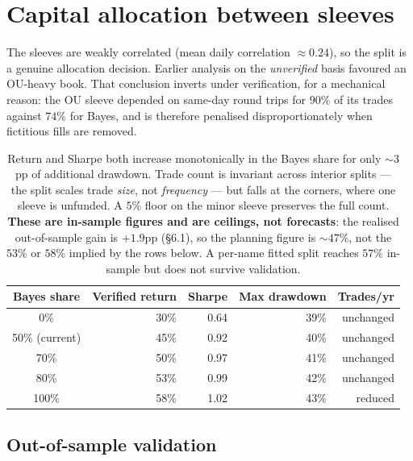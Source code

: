 \documentclass[11pt]{article}
\begin{document}
\section{Capital allocation between sleeves}

The sleeves are weakly correlated (mean daily correlation $\approx0.24$), so the split is a
genuine allocation decision. Earlier analysis on the \emph{unverified} basis favoured an
OU-heavy book. That conclusion inverts under verification, for a mechanical reason: the OU
sleeve depended on same-day round trips for $90\%$ of its trades against $74\%$ for Bayes, and
is therefore penalised disproportionately when fictitious fills are removed.

\begin{table}[H]\centering\small
\renewcommand{\arraystretch}{1.15}
\begin{tabular}{c r r r r}
\toprule
\textbf{Bayes share} & \textbf{Verified return} & \textbf{Sharpe} & \textbf{Max drawdown} & \textbf{Trades/yr}\\
\midrule
0\%   & 30\% & 0.64 & 39\% & unchanged\\
\rowcolor{bckeep} 50\% (current) & 45\% & 0.92 & 40\% & unchanged\\
70\%  & 50\% & 0.97 & 41\% & unchanged\\
\rowcolor{bcact} 80\%  & 53\% & 0.99 & 42\% & unchanged\\
100\% & 58\% & 1.02 & 43\% & reduced\\
\bottomrule
\end{tabular}
\caption*{\footnotesize Return and Sharpe both increase monotonically in the Bayes share for
only $\sim\!3$pp of additional drawdown. Trade count is invariant across interior splits --- the
split scales trade \emph{size}, not \emph{frequency} --- but falls at the corners, where one
sleeve is unfunded. A $5\%$ floor on the minor sleeve preserves the full count.
\textbf{These are in-sample figures and are ceilings, not forecasts}: the realised
out-of-sample gain is $+1.9$pp (\S6.1), so the planning figure is $\sim\!47\%$, not the $53\%$
or $58\%$ implied by the rows below. A per-name fitted split reaches $57\%$ in-sample but does
not survive validation.}
\end{table}

\subsection{Out-of-sample validation}
\end{document}
